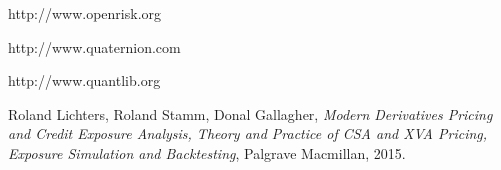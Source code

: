 \documentclass[12pt, a4paper]{article}
\begin{document}



\begin{thebibliography}{*}

 http://www.openrisk.org

 http://www.quaternion.com

 http://www.quantlib.org
 
Roland Lichters, Roland Stamm, Donal Gallagher, 
{\em Modern Derivatives Pricing and Credit Exposure Analysis, Theory and Practice of CSA and XVA Pricing, Exposure Simulation and Backtesting}, 
Palgrave Macmillan, 2015.


\end{thebibliography}
\end{document}
